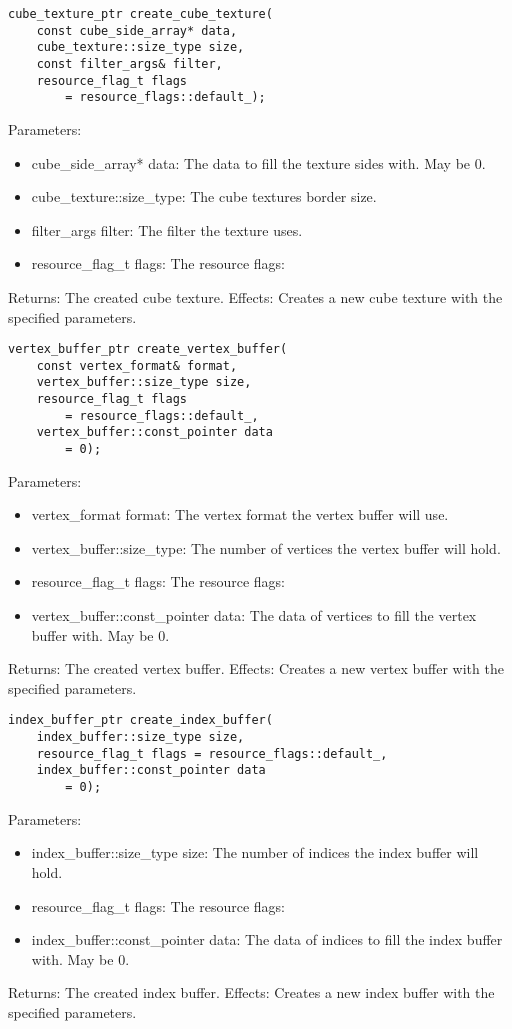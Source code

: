\documentclass{article}
\begin{document}
\begin{lstlisting}
cube_texture_ptr create_cube_texture(
	const cube_side_array* data,
	cube_texture::size_type size,
	const filter_args& filter,
	resource_flag_t flags
		= resource_flags::default_);
\end{lstlisting}
Parameters:
\begin{itemize}
\item cube\_side\_array* data: The data to fill the texture sides with. May be 0.
\item cube\_texture::size\_type: The cube textures border size.
\item filter\_args filter: The filter the texture uses.
\item resource\_flag\_t flags: The resource flags:
\end{itemize}
Returns: The created cube texture.
Effects: Creates a new cube texture with the specified parameters.

\begin{lstlisting}
vertex_buffer_ptr create_vertex_buffer(
	const vertex_format& format,
	vertex_buffer::size_type size,
	resource_flag_t flags
		= resource_flags::default_,
	vertex_buffer::const_pointer data
		= 0);
\end{lstlisting}
Parameters:
\begin{itemize}
\item vertex\_format format: The vertex format the vertex buffer will use.
\item vertex\_buffer::size\_type: The number of vertices the vertex buffer will hold.
\item resource\_flag\_t flags: The resource flags:
\item vertex\_buffer::const\_pointer data: The data of vertices to fill the vertex buffer with. May be 0.
\end{itemize}
Returns: The created vertex buffer.
Effects: Creates a new vertex buffer with the specified parameters.

\begin{lstlisting}
index_buffer_ptr create_index_buffer(
	index_buffer::size_type size,
	resource_flag_t flags = resource_flags::default_,
	index_buffer::const_pointer data
		= 0);
\end{lstlisting}
Parameters:
\begin{itemize}
\item index\_buffer::size\_type size: The number of indices the index buffer will hold.
\item resource\_flag\_t flags: The resource flags:
\item index\_buffer::const\_pointer data: The data of indices to fill the index buffer with. May be 0.
\end{itemize}
Returns: The created index buffer.
Effects: Creates a new index buffer with the specified parameters.
\end{document}
